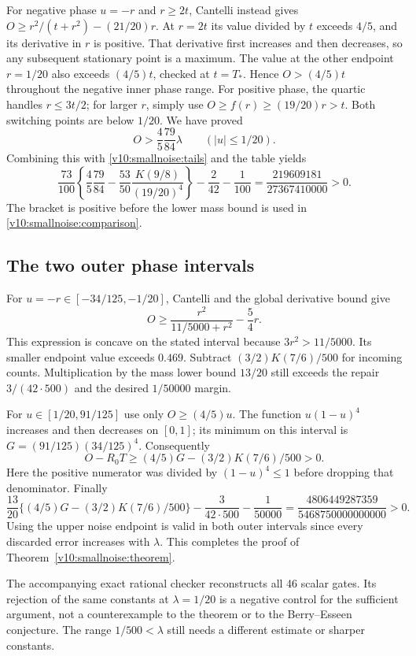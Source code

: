 For negative phase $u=-r$ and $r\ge2t$, Cantelli instead gives
$O\ge r^2/(t+r^2)-(21/20)r$. At $r=2t$ its value divided by $t$
exceeds $4/5$, and its derivative in $r$ is positive. That derivative
first increases and then decreases, so any subsequent stationary point
is a maximum. The value at the other endpoint $r=1/20$ also exceeds
$(4/5)t$, checked at $t=T_*$. Hence $O>(4/5)t$ throughout the negative
inner phase range. For positive phase, the quartic handles $r\le3t/2$;
for larger $r$, simply use $O\ge f(r)\ge(19/20)r>t$.
Both switching points are below $1/20$. We have proved
\[
                         O>\frac45\frac{79}{84}\lambda
                         \qquad (|u|\le1/20).
\]
Combining this with \eqref{v10:smallnoise:tails} and the table yields
\[
 \frac{73}{100}\left\{\frac45\frac{79}{84}
       -\frac{53}{50}\frac{K(9/8)}{(19/20)^4}\right\}
                      -\frac2{42}-\frac1{100}
   =\frac{219609181}{27367410000}>0.
\]
The bracket is positive before the lower mass bound is used in
\eqref{v10:smallnoise:comparison}.

\subsection{The two outer phase intervals}
For $u=-r\in[-34/125,-1/20]$, Cantelli and the global derivative bound give
\[
 O\ge\frac{r^2}{11/5000+r^2}-\frac54r.
\]
This expression is concave on the stated interval because
$3r^2>11/5000$. Its smaller endpoint value exceeds $0.469$.
Subtract $(3/2)K(7/6)/500$ for incoming counts. Multiplication by the
mass lower bound $13/20$ still exceeds the repair $3/(42\cdot500)$
and the desired $1/50000$ margin.

For $u\in[1/20,91/125]$ use only $O\ge(4/5)u$.
The function $u(1-u)^4$ increases and then decreases on $[0,1]$;
its minimum on this interval is
$G=(91/125)(34/125)^4$. Consequently
\[
 O-R_0T\ge (4/5)G-(3/2)K(7/6)/500>0.
\]
Here the positive numerator was divided by $(1-u)^4\le1$ before
dropping that denominator. Finally
\[
 \frac{13}{20}\{(4/5)G-(3/2)K(7/6)/500\}
       -\frac3{42\cdot500}-\frac1{50000}
       =\frac{4806449287359}{5468750000000000}>0.
\]
Using the upper noise endpoint is valid in both outer intervals since
every discarded error increases with $\lambda$.
This completes the proof of Theorem~\ref{v10:smallnoise:theorem}.

The accompanying exact rational checker reconstructs all 46 scalar gates.
Its rejection of the same constants at $\lambda=1/20$ is a negative control
for the sufficient argument, not a counterexample to the theorem or to
the Berry--Esseen conjecture. The range $1/500<\lambda$ still needs a
different estimate or sharper constants.

